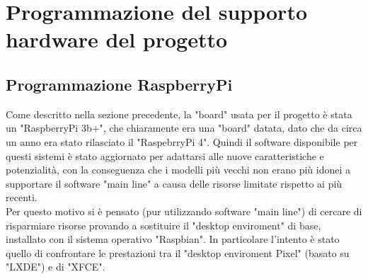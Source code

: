 \chapter{Programmazione del supporto hardware del progetto}\label{cap:Programmazione del supporto hardware del progetto}

\section{Programmazione RaspberryPi}\label{sez:Programmazione RaspberryPi}

Come descritto nella sezione precedente, la "board" usata per il progetto è stata un "RaspberryPi 3b+", che chiaramente  era una "board" datata, dato che da circa un anno era stato rilasciato il "RaspebrryPi 4". Quindi il software disponibile per questi sistemi è stato aggiornato per adattarsi alle nuove caratteristiche e potenzialità, con la conseguenza che i modelli più vecchi non erano più idonei a supportare il software "main line" a causa delle risorse limitate rispetto ai più recenti.\\
Per questo motivo si è pensato (pur utilizzando software "main line") di cercare di risparmiare risorse provando a sostituire il "desktop enviroment" di base, installato con il sistema operativo "Raspbian". In particolare l'intento è stato quello di confrontare le prestazioni tra il "desktop enviroment Pixel" (basato su "LXDE") e di "XFCE".  

